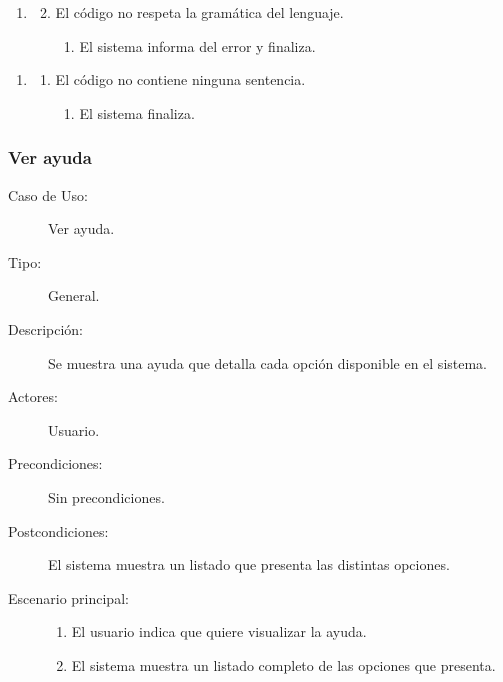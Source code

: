 \begin{description}
\begin{enumerate}
   \setcounter{enumi}{0}
   \renewcommand{\labelenumi}{}
   \renewcommand{\labelenumiii}{\arabic{enumiii}.}
   \renewcommand{\labelenumii}{\arabic{enumi}\alph{enumii}.}
      \item 
      \begin {enumerate}
         \setcounter{enumii}{1}
         \item El código no respeta la gramática del lenguaje.
         \begin{enumerate}
         \item El sistema informa del error y finaliza.
         \end{enumerate}
      \end{enumerate}
   \end{enumerate}
   \begin{enumerate} \itemsep1pt \parskip0pt 
   \setcounter{enumi}{1}
   \renewcommand{\labelenumi}{}
   \renewcommand{\labelenumiii}{\arabic{enumiii}.}
   \renewcommand{\labelenumii}{\arabic{enumi}\alph{enumii}.}
      \item 
      \begin {enumerate}
         \setcounter{enumii}{0}
         \item El código no contiene ninguna sentencia.
         \begin{enumerate}
         \item El sistema finaliza.
         \end{enumerate}
      \end{enumerate}
   \end{enumerate}
\end{description}

\subsubsection{Ver ayuda}

\begin{description}
   \item[Caso de Uso:]  Ver ayuda.
   \item[Tipo:] General.
   \item[Descripción:] 
   Se muestra una ayuda que detalla cada opción disponible en el sistema.
   \item[Actores:] 
   Usuario.
   \item[Precondiciones:] 
   Sin precondiciones.
   \item[Postcondiciones:] 
   El sistema muestra un listado que presenta las distintas opciones.
   \item[Escenario principal:] \hfill
   \begin{enumerate}
   \item El usuario indica que quiere visualizar la ayuda.
   \item El sistema muestra un listado completo de las opciones que
   presenta. 
   \end{enumerate}
\end{description}

